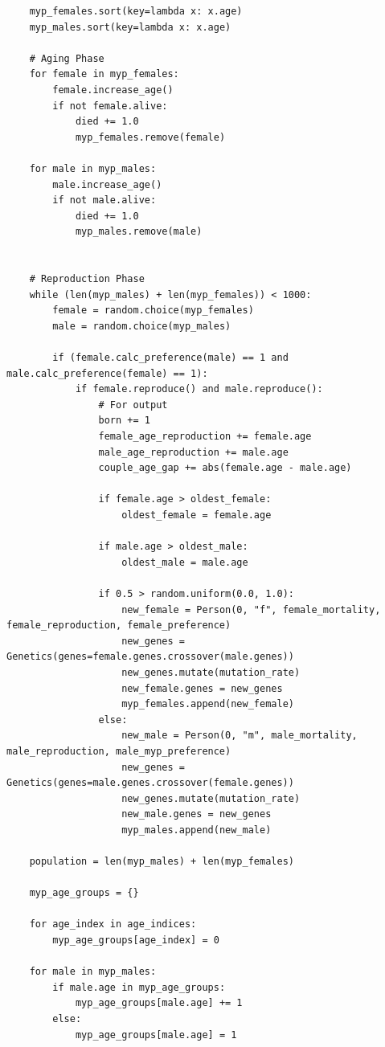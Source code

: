 \documentclass[authoryearcitations]{UoYCSproject}
\begin{document}
\begin{landscape}
\begin{verbatim}
    myp_females.sort(key=lambda x: x.age)
    myp_males.sort(key=lambda x: x.age)

    # Aging Phase
    for female in myp_females:
        female.increase_age()
        if not female.alive:
            died += 1.0
            myp_females.remove(female)

    for male in myp_males:
        male.increase_age()
        if not male.alive:
            died += 1.0
            myp_males.remove(male)


    # Reproduction Phase
    while (len(myp_males) + len(myp_females)) < 1000:
        female = random.choice(myp_females)
        male = random.choice(myp_males)

        if (female.calc_preference(male) == 1 and male.calc_preference(female) == 1):
            if female.reproduce() and male.reproduce():
                # For output
                born += 1
                female_age_reproduction += female.age
                male_age_reproduction += male.age
                couple_age_gap += abs(female.age - male.age)

                if female.age > oldest_female:
                    oldest_female = female.age

                if male.age > oldest_male:
                    oldest_male = male.age

                if 0.5 > random.uniform(0.0, 1.0):
                    new_female = Person(0, "f", female_mortality, female_reproduction, female_preference)
                    new_genes = Genetics(genes=female.genes.crossover(male.genes))
                    new_genes.mutate(mutation_rate)
                    new_female.genes = new_genes
                    myp_females.append(new_female)
                else:
                    new_male = Person(0, "m", male_mortality, male_reproduction, male_myp_preference)
                    new_genes = Genetics(genes=male.genes.crossover(female.genes))
                    new_genes.mutate(mutation_rate)
                    new_male.genes = new_genes
                    myp_males.append(new_male)

    population = len(myp_males) + len(myp_females)

    myp_age_groups = {}

    for age_index in age_indices:
        myp_age_groups[age_index] = 0

    for male in myp_males:
        if male.age in myp_age_groups:
            myp_age_groups[male.age] += 1
        else:
            myp_age_groups[male.age] = 1


\end{verbatim}
\end{landscape}
\end{document}
